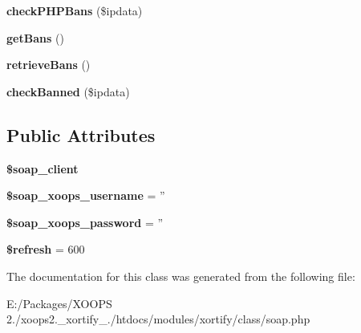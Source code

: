 \begin{DoxyCompactItemize}
\item 
\hypertarget{class_s_o_a_p_xortify_exchange_ad6923b1bbbd98112d062e1ee7da2a4db}{{\bfseries check\-P\-H\-P\-Bans} (\$ipdata)}\label{class_s_o_a_p_xortify_exchange_ad6923b1bbbd98112d062e1ee7da2a4db}

\item 
\hypertarget{class_s_o_a_p_xortify_exchange_a198b7faaa8cb1484ebf80b0d890ea82b}{{\bfseries get\-Bans} ()}\label{class_s_o_a_p_xortify_exchange_a198b7faaa8cb1484ebf80b0d890ea82b}

\item 
\hypertarget{class_s_o_a_p_xortify_exchange_acf8bedb7f67feff7e29acc3d8f2a0245}{{\bfseries retrieve\-Bans} ()}\label{class_s_o_a_p_xortify_exchange_acf8bedb7f67feff7e29acc3d8f2a0245}

\item 
\hypertarget{class_s_o_a_p_xortify_exchange_a892ef1ddda332b7d8c587ad279fcb027}{{\bfseries check\-Banned} (\$ipdata)}\label{class_s_o_a_p_xortify_exchange_a892ef1ddda332b7d8c587ad279fcb027}

\end{DoxyCompactItemize}
\subsection*{Public Attributes}
\begin{DoxyCompactItemize}
\item 
\hypertarget{class_s_o_a_p_xortify_exchange_a96161594d6f2b2d4c20ce79d21f07798}{{\bfseries \$soap\-\_\-client}}\label{class_s_o_a_p_xortify_exchange_a96161594d6f2b2d4c20ce79d21f07798}

\item 
\hypertarget{class_s_o_a_p_xortify_exchange_a933932edeecd0282214637ecc8da5d6c}{{\bfseries \$soap\-\_\-xoops\-\_\-username} = ''}\label{class_s_o_a_p_xortify_exchange_a933932edeecd0282214637ecc8da5d6c}

\item 
\hypertarget{class_s_o_a_p_xortify_exchange_aa7afcf8015f38072b6084b6b7cc726f2}{{\bfseries \$soap\-\_\-xoops\-\_\-password} = ''}\label{class_s_o_a_p_xortify_exchange_aa7afcf8015f38072b6084b6b7cc726f2}

\item 
\hypertarget{class_s_o_a_p_xortify_exchange_a67839d550b49d915194d903e88d3fa7c}{{\bfseries \$refresh} = 600}\label{class_s_o_a_p_xortify_exchange_a67839d550b49d915194d903e88d3fa7c}

\end{DoxyCompactItemize}


The documentation for this class was generated from the following file\-:\begin{DoxyCompactItemize}
\item 
E\-:/\-Packages/\-X\-O\-O\-P\-S 2./xoops2.\-\_\-xortify\-\_./htdocs/modules/xortify/class/soap.\-php\end{DoxyCompactItemize}
